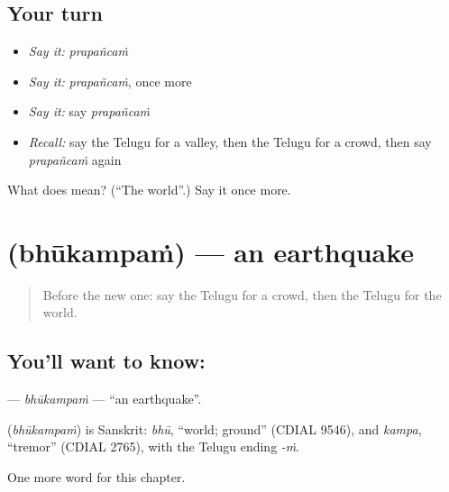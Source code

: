 \subsection*{Your turn}
\begin{itemize}
\raggedright
  \item \emph{Say it:} \emph{prapañcaṁ}
  \item \emph{Say it:} \emph{prapañcaṁ}, once more
  \item \emph{Say it:} say \emph{prapañcaṁ}
  \item \emph{Recall:} say the Telugu for a valley, then the Telugu for a crowd, then say \emph{prapañcaṁ} again
\end{itemize}

\begin{tcolorbox}[breakable,colback=teal!4,colframe=teal!35!black,title={Before you move on}]
What does  mean? (\textquotedblleft{}The world\textquotedblright{}.) Say it once more.
\end{tcolorbox}
\section[\texorpdfstring{\te{భూకంపం} (bhūkampaṁ)}{భూకంపం (bhūkampaṁ)}]{ (bhūkampaṁ) — an earthquake}

\label{lesson:TE-C175-bhukampam}



\begin{quote}
Before the new one: say the Telugu for a crowd, then the Telugu for the world.
\end{quote}

\subsection*{You'll want to know: }
\textbf{} — \emph{bhūkampaṁ} — \textquotedblleft{}an earthquake\textquotedblright{}.

\begin{cousinweb}
\textbf{} (\emph{bhūkampaṁ}) is Sanskrit: \emph{bhū}, \textquotedblleft{}world; ground\textquotedblright{} (CDIAL 9546), and \emph{kampa}, \textquotedblleft{}tremor\textquotedblright{} (CDIAL 2765), with the Telugu ending \emph{-ṁ}.
\end{cousinweb}

\begin{grammarlens}[title={What you've built}]
One more word for this chapter.
\end{grammarlens}

